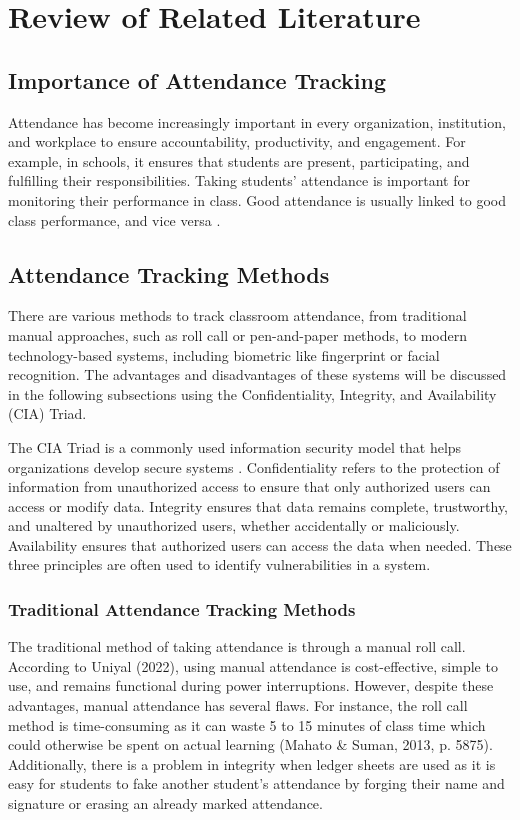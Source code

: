 \chapter{Review of Related Literature}
\label{sec:relatedlit}

\section{Importance of Attendance Tracking}

Attendance has become increasingly important in every organization, institution, and workplace to ensure accountability, productivity, and engagement. For example, in schools, it ensures that students are present, participating, and fulfilling their responsibilities. Taking students' attendance is important for monitoring their performance in class. Good attendance is usually linked to good class performance, and vice versa \cite{Zhi:2014}.


\section{Attendance Tracking Methods}

There are various methods to track classroom attendance, from traditional manual approaches, such as roll call or pen-and-paper methods, to modern technology-based systems, including biometric like fingerprint or facial recognition. The advantages and disadvantages of these systems will be discussed in the following subsections using the Confidentiality, Integrity, and Availability (CIA) Triad.

The CIA Triad is a commonly used information security model that helps organizations develop secure systems \cite{fruhlinger2024cia}.  Confidentiality refers to the protection of information from unauthorized access to ensure that only authorized users can access or modify data. Integrity ensures that data remains complete, trustworthy, and unaltered by unauthorized users, whether accidentally or maliciously. Availability ensures that authorized users can access the data when needed. These three principles are often used to identify vulnerabilities in a system.

\subsection{Traditional Attendance Tracking Methods}

The traditional method of taking attendance is through a manual roll call. According to Uniyal (2022), using manual attendance is cost-effective, simple to use, and remains functional during power interruptions. However, despite these advantages, manual attendance has several flaws. For instance, the roll call method is time-consuming as it can waste 5 to 15 minutes of class time which could otherwise be spent on actual learning (Mahato \& Suman, 2013, p. 5875). Additionally, there is a problem in integrity when ledger sheets are used as it is easy for students to fake another student’s attendance by forging their name and signature or erasing an already marked attendance.

